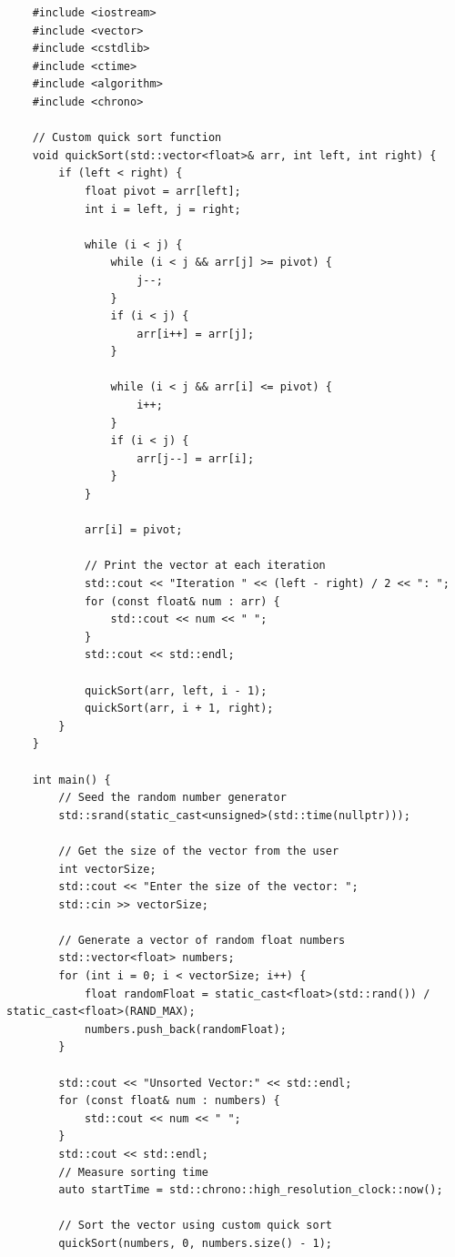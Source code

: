 \documentclass[12pt]{extarticle}
\begin{document}
{\selectfont

\begin{verbatim}
    #include <iostream>
    #include <vector>
    #include <cstdlib>
    #include <ctime>
    #include <algorithm>
    #include <chrono>
    
    // Custom quick sort function
    void quickSort(std::vector<float>& arr, int left, int right) {
        if (left < right) {
            float pivot = arr[left];
            int i = left, j = right;
    
            while (i < j) {
                while (i < j && arr[j] >= pivot) {
                    j--;
                }
                if (i < j) {
                    arr[i++] = arr[j];
                }
    
                while (i < j && arr[i] <= pivot) {
                    i++;
                }
                if (i < j) {
                    arr[j--] = arr[i];
                }
            }
    
            arr[i] = pivot;
    
            // Print the vector at each iteration
            std::cout << "Iteration " << (left - right) / 2 << ": ";
            for (const float& num : arr) {
                std::cout << num << " ";
            }
            std::cout << std::endl;
    
            quickSort(arr, left, i - 1);
            quickSort(arr, i + 1, right);
        }
    }
    
    int main() {
        // Seed the random number generator
        std::srand(static_cast<unsigned>(std::time(nullptr)));
    
        // Get the size of the vector from the user
        int vectorSize;
        std::cout << "Enter the size of the vector: ";
        std::cin >> vectorSize;
    
        // Generate a vector of random float numbers
        std::vector<float> numbers;
        for (int i = 0; i < vectorSize; i++) {
            float randomFloat = static_cast<float>(std::rand()) / static_cast<float>(RAND_MAX);
            numbers.push_back(randomFloat);
        }
    
        std::cout << "Unsorted Vector:" << std::endl;
        for (const float& num : numbers) {
            std::cout << num << " ";
        }
        std::cout << std::endl;
        // Measure sorting time
        auto startTime = std::chrono::high_resolution_clock::now();
    
        // Sort the vector using custom quick sort
        quickSort(numbers, 0, numbers.size() - 1);
    

\end{verbatim}}
\end{document}
